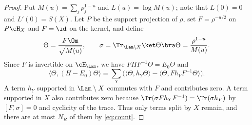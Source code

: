 \begin{proof}
Put $M(u)=\sum_jp_j^{1-u}$ and $L(u)=\log M(u)$; note that $L(0)=0$ and
$L'(0)=S(X)$. Let $P$ be the support projection of $\rho$, set
$F=\rho^{-u/2}$ on $P\cH_X$ and $F=\id$ on the kernel, and define
\[
 \Theta=\frac{F\Om}{\sqrt{M(u)}},\qquad
 \sigma=\Tr_{\Lam\setminus X}\ket\Theta\bra\Theta=\frac{\rho^{1-u}}{M(u)} .
\]
Since $F$ is invertible on $\cH_\Lam$, we have $FHF^{-1}\Theta=E_0\Theta$ and
\begin{equation}\label{eq:tiltenergy}
 \langle\Theta,(H-E_0)\Theta\rangle
 =\sum_Y\bigl(\langle\Theta,h_Y\Theta\rangle-\langle\Theta,Fh_YF^{-1}\Theta\rangle\bigr).
\end{equation}
A term $h_Y$ supported in $\Lam\setminus X$ commutes with $F$ and
contributes zero. A term supported in $X$ also contributes zero because
$\Tr(\sigma Fh_YF^{-1})=\Tr(\sigma h_Y)$ by $[F,\sigma]=0$ and cyclicity of
the trace. Thus only terms split by $X$ remain, and there are at most
$N_R$ of them by \eqref{eq:count}.


\end{proof}
